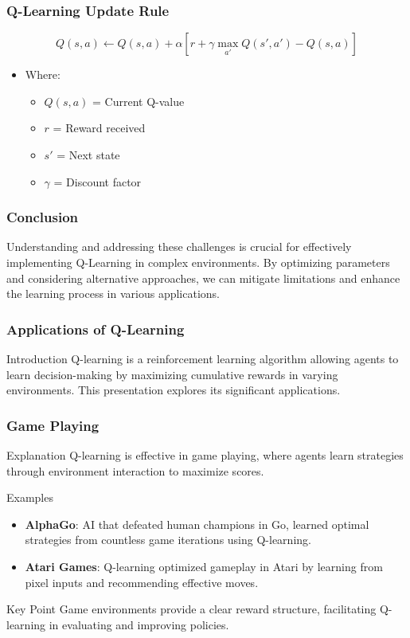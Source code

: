 \documentclass{beamer}
\begin{document}
\begin{frame}[fragile]
    \frametitle{Q-Learning Update Rule}
    \begin{equation}
        Q(s,a) \leftarrow Q(s,a) + \alpha \left[r + \gamma \max_{a'} Q(s',a') - Q(s,a)\right]
    \end{equation}
    \begin{itemize}
        \item Where:
        \begin{itemize}
            \item $Q(s, a)$ = Current Q-value
            \item $r$ = Reward received
            \item $s'$ = Next state
            \item $\gamma$ = Discount factor
        \end{itemize}
    \end{itemize}
\end{frame}

\begin{frame}[fragile]
    \frametitle{Conclusion}
    Understanding and addressing these challenges is crucial for effectively implementing Q-Learning in complex environments. By optimizing parameters and considering alternative approaches, we can mitigate limitations and enhance the learning process in various applications.
\end{frame}

\begin{frame}[fragile]
    \frametitle{Applications of Q-Learning}
    \begin{block}{Introduction}
        Q-learning is a reinforcement learning algorithm allowing agents to learn decision-making by maximizing cumulative rewards in varying environments. This presentation explores its significant applications.
    \end{block}
\end{frame}

\begin{frame}[fragile]
    \frametitle{Game Playing}
    \begin{block}{Explanation}
        Q-learning is effective in game playing, where agents learn strategies through environment interaction to maximize scores.
    \end{block}
    \begin{exampleblock}{Examples}
        \begin{itemize}
            \item \textbf{AlphaGo}: AI that defeated human champions in Go, learned optimal strategies from countless game iterations using Q-learning.
            \item \textbf{Atari Games}: Q-learning optimized gameplay in Atari by learning from pixel inputs and recommending effective moves.
        \end{itemize}
    \end{exampleblock}
    \begin{block}{Key Point}
        Game environments provide a clear reward structure, facilitating Q-learning in evaluating and improving policies.
    \end{block}
\end{frame}
\end{document}
